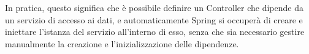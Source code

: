 In pratica, questo significa che è possibile definire un Controller che dipende da un servizio di accesso ai dati, e automaticamente Spring si occuperà di creare e iniettare l'istanza del servizio all'interno di esso, senza che sia necessario gestire manualmente la creazione e l'inizializzazione delle dipendenze.

\pagebreak